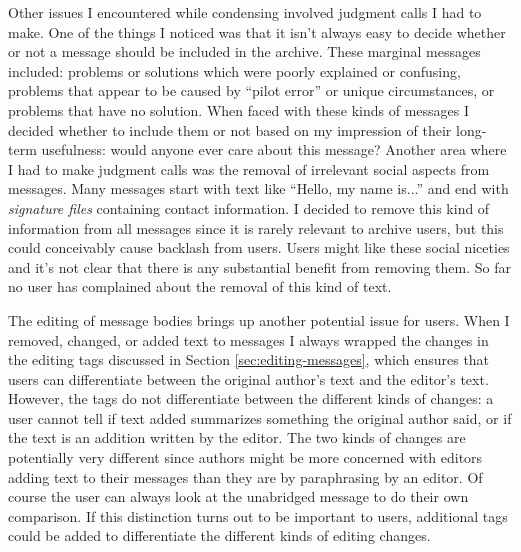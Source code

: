 Other issues I encountered while condensing involved judgment calls I had to
make. One of the things I noticed was that it isn't always easy to decide
whether or not a message should be included in the archive. These marginal
messages included: problems or solutions which were poorly explained or
confusing, problems that appear to be caused by ``pilot error'' or unique
circumstances, or problems that have no solution. When faced with these kinds
of messages I decided whether to include them or not based on my impression of
their long-term usefulness: would anyone ever care about this message? Another
area where I had to make judgment calls was the removal of irrelevant social
aspects from messages. Many messages start with text like ``Hello, my name
is...'' and end with {\it signature files} containing contact information. I
decided to remove this kind of information from all messages since it is rarely
relevant to archive users, but this could conceivably cause backlash from
users. Users might like these social niceties and it's not clear that there is
any substantial benefit from removing them. So far no user has complained about
the removal of this kind of text.

The editing of message bodies brings up another potential issue for users. When
I removed, changed, or added text to messages I always wrapped the changes in
the editing tags discussed in Section \ref{sec:editing-messages}, which ensures
that users can differentiate between the original author's text and the
editor's text. However, the tags do not differentiate between the different
kinds of changes: a user cannot tell if text added summarizes something the
original author said, or if the text is an addition written by the editor. The
two kinds of changes are potentially very different since authors might be more
concerned with editors adding text to their messages than they are by
paraphrasing by an editor. Of course the user can always look at the unabridged
message to do their own comparison. If this distinction turns out to be
important to users, additional tags could be added to differentiate the
different kinds of editing changes.

